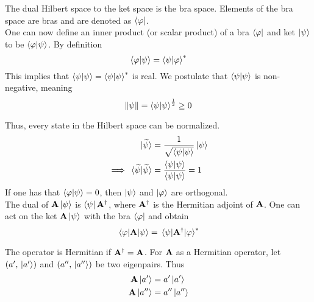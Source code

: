 \documentclass[12pt,a4paper,titlepage]{article}
\begin{document}
The dual Hilbert space to the ket space is the bra space. Elements of the bra space are bras and are denoted as $\bra{\varphi}$.\\

One can now define an inner product (or scalar product) of a bra $\bra{\varphi}$ and ket $\ket{\psi}$ to be $\braket{\varphi}{\psi}$. By definition
\begin{equation}
\braket{\varphi}{\psi}=\braket{\psi}{\varphi}^{*}
\end{equation}
This implies that $\braket{\psi}{\psi}=\braket{\psi}{\psi}^{*}$ is real. We postulate that $\braket{\psi}{\psi}$ is non-negative, meaning
\begin{equation}
\norm{\psi}=\braket{\psi}{\psi}^{\frac{1}{2}}\geq0
\end{equation}

Thus, every state in the Hilbert space can be normalized.
\begin{equation}
\begin{aligned}
\ket*{\widetilde{\psi}}&=\frac{1}{\sqrt{\braket{\psi}{\psi}}}\ket{\psi}\\
\implies \braket*{\widetilde{\psi}}{\widetilde{\psi}}&=\frac{\braket{\psi}{\psi}}{\braket{\psi}{\psi}}=1
\end{aligned}
\end{equation}
If one has that $\braket{\varphi}{\psi}=0$, then $\ket{\psi}$ and $\ket{\varphi}$ are orthogonal.\\

The dual of $\vb{A}\ket{\psi}$ is $\bra{\psi}\vb{A}^{\dagger}$, where $\vb{A}^{\dagger}$ is the Hermitian adjoint of $\vb{A}$. One can act on the ket $\vb{A}\ket{\psi}$ with the bra $\bra{\varphi}$ and obtain
\begin{equation}
\mel{\varphi}{\vb{A}}{\psi}=\mel{\psi}{\vb{A}^{\dagger}}{\varphi}^{*}
\end{equation}

The operator is Hermitian if $\vb{A}^{\dagger}=\vb{A}$. For $\vb{A}$ as a Hermitian operator, let $(a',\ket*{a'})$ and $(a'',\ket*{a''})$ be two eigenpairs. Thus
\begin{equation}
\begin{aligned}
\vb{A}\ket*{a'}&=a'\ket*{a'}\\
\vb{A}\ket*{a''}&=a''\ket*{a''}
\end{aligned}
\end{equation}
\end{document}
